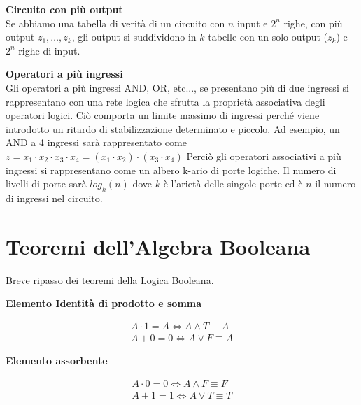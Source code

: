 \begin{defn}
	\textbf{Circuito con più output} \\ 
	Se abbiamo una tabella di verità di un circuito con $ n $ input e $ 2^n $ righe, con più output $ z_1, \dots, z_k $, gli output si suddividono in $ k $ tabelle con un solo output ($ z_k $) e $ 2^n $ righe di input.
\end{defn}

\begin{defn}
	\textbf{Operatori a più ingressi} \\ 
	Gli operatori a più ingressi AND, OR, etc..., se presentano più di due ingressi si rappresentano con una rete logica che sfrutta la proprietà associativa degli operatori logici. Ciò comporta un limite massimo di ingressi perché viene introdotto un ritardo di stabilizzazione determinato e piccolo.
	Ad esempio, un AND a 4 ingressi sarà rappresentato come $ z = x_1 \cdot x_2 \cdot x_3 \cdot x_4 = (x_1 \cdot x_2 ) \cdot (x_3 \cdot x_4)  $
	Perciò gli operatori associativi a più ingressi si rappresentano come un albero k-ario di porte logiche. Il numero di livelli di porte sarà $ log_k(n) $ dove $ k $ è l'arietà delle singole porte ed è $ n $ il numero di ingressi nel circuito.
\end{defn}


\section{Teoremi dell'Algebra Booleana}
Breve ripasso dei teoremi della Logica Booleana.

\begin{thm}
	\textbf{Elemento Identità di prodotto e somma}
	
	\begin{equation*}\begin{aligned}
		A \cdot 1 = A \iff A \land T \equiv A \\
		A + 0 = 0 \iff A \lor F \equiv A
	\end{aligned}\end{equation*}
\end{thm}

\begin{thm}
	\textbf{Elemento assorbente}
	
	\begin{equation*}\begin{aligned}
		A \cdot 0 = 0 \iff A \land F \equiv F \\
		A + 1 = 1 \iff A \lor T \equiv T 
	\end{aligned}\end{equation*}
\end{thm}

